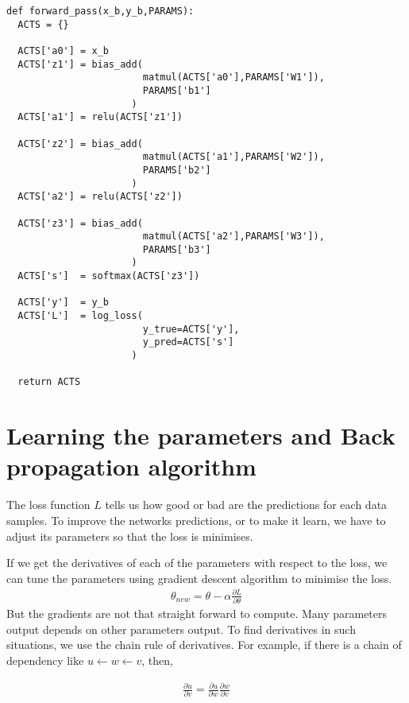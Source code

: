 \documentclass[10pt]{article}
\begin{document}
\begin{verbatim}
def forward_pass(x_b,y_b,PARAMS):
  ACTS = {}

  ACTS['a0'] = x_b
  ACTS['z1'] = bias_add(
                        matmul(ACTS['a0'],PARAMS['W1']), 
                        PARAMS['b1']
                      )
  ACTS['a1'] = relu(ACTS['z1'])

  ACTS['z2'] = bias_add(
                        matmul(ACTS['a1'],PARAMS['W2']), 
                        PARAMS['b2']
                      )
  ACTS['a2'] = relu(ACTS['z2'])
  
  ACTS['z3'] = bias_add(
                        matmul(ACTS['a2'],PARAMS['W3']), 
                        PARAMS['b3']
                      )
  ACTS['s']  = softmax(ACTS['z3'])
  
  ACTS['y']  = y_b
  ACTS['L']  = log_loss(
                        y_true=ACTS['y'], 
                        y_pred=ACTS['s']
                      )

  return ACTS
\end{verbatim}


\section{Learning the parameters and Back propagation algorithm}


The loss function $L$ tells us how good or bad are the predictions for each data samples. To improve the networks predictions, or to make it learn, we have to adjust its parameters so that the loss is minimises. 

If we get the derivatives of each of the parameters with respect to the loss, we can tune the parameters using gradient descent algorithm to minimise the loss. 
$$ \begin{aligned}
\theta_{new} = \theta - \alpha \frac{\partial L}{\partial \theta}
\end{aligned} $$
But the gradients are not that straight forward to compute. Many parameters output depends on other parameters output. To find derivatives in such situations, we use the chain rule of derivatives. For example, if there is a chain of dependency like $u\leftarrow w \leftarrow v$, then,

$$ \begin{aligned}
 \frac{\partial u}{\partial v} = \frac{\partial u}{\partial w}\frac{\partial w}{\partial v}
\end{aligned} $$
\end{document}
